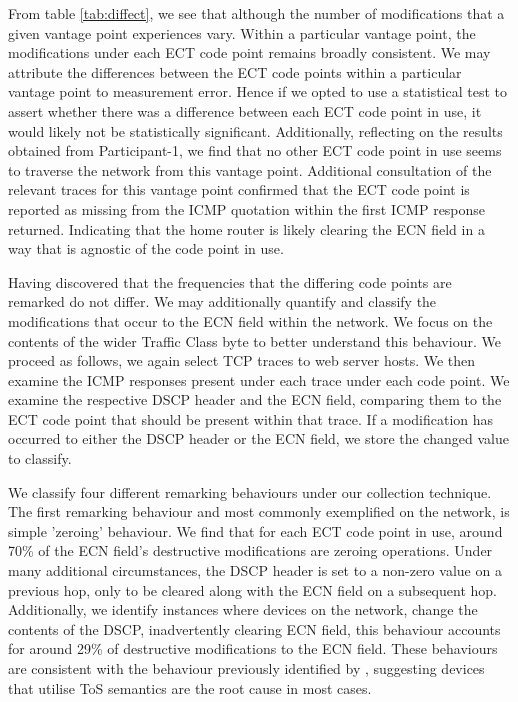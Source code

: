 \documentclass{l4proj}
\begin{document}
From table \ref{tab:diffect}, we see that although the number of modifications that a given vantage point experiences vary. Within a particular vantage point, the modifications under each ECT code point remains broadly consistent. We may attribute the differences between the ECT code points within a particular vantage point to measurement error. Hence if we opted to use a statistical test to assert whether there was a difference between each ECT code point in use, it would likely not be statistically significant. Additionally, reflecting on the results obtained from Participant-1, we find that no other ECT code point in use seems to traverse the network from this vantage point. Additional consultation of the relevant traces for this vantage point confirmed that the ECT code point is reported as missing from the ICMP quotation within the first ICMP response returned. Indicating that the home router is likely clearing the ECN field in a way that is agnostic of the code point in use.


Having discovered that the frequencies that the differing code points are remarked do not differ. We may additionally quantify and classify the modifications that occur to the ECN field within the network. We focus on the contents of the wider Traffic Class byte to better understand this behaviour. We proceed as follows, we again select TCP traces to web server hosts. We then examine the ICMP responses present under each trace under each code point. We examine the respective DSCP header and the ECN field, comparing them to the ECT code point that should be present within that trace. If a modification has occurred to either the DSCP header or the ECN field, we store the changed value to classify.

We classify four different remarking behaviours under our collection technique. The first remarking behaviour and most commonly exemplified on the network, is simple 'zeroing' behaviour. We find that for each ECT code point in use, around 70\% of the ECN field's destructive modifications are zeroing operations. Under many additional circumstances, the DSCP header is set to a non-zero value on a previous hop, only to be cleared along with the ECN field on a subsequent hop. Additionally, we identify instances where devices on the network, change the contents of the DSCP, inadvertently clearing ECN field, this behaviour accounts for around 29\% of destructive modifications to the ECN field. These behaviours are consistent with the behaviour previously identified by \cite{custura_exploring_2018}, suggesting devices that utilise ToS semantics are the root cause in most cases.
\end{document}
